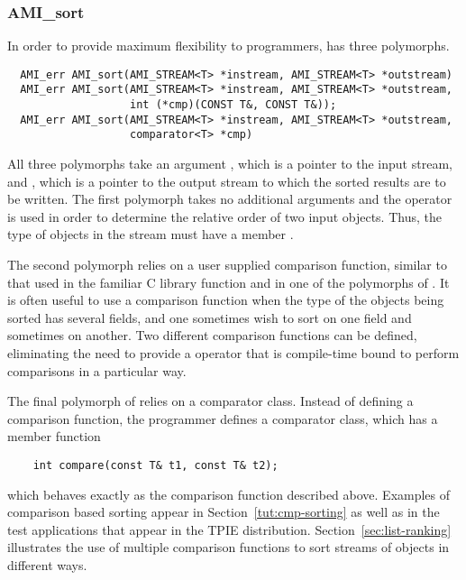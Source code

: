 \subsubsection{AMI\_sort}

In order to provide maximum flexibility to programmers, 
has three polymorphs.
\begin{verbatim}
  AMI_err AMI_sort(AMI_STREAM<T> *instream, AMI_STREAM<T> *outstream)
  AMI_err AMI_sort(AMI_STREAM<T> *instream, AMI_STREAM<T> *outstream,
                   int (*cmp)(CONST T&, CONST T&));
  AMI_err AMI_sort(AMI_STREAM<T> *instream, AMI_STREAM<T> *outstream,
                   comparator<T> *cmp)
\end{verbatim}

All three polymorphs take an argument , which is a pointer
to the input stream, and , which is a pointer to the output
stream to which the sorted results are to be written. The first polymorph
takes no additional arguments and the \myverb{<} operator is used in order to
determine the relative order of two input objects. Thus, the type 
of objects in the stream must have a member .

The second polymorph relies on a user supplied comparison function, similar
to that used in the familiar C library function  and in one
of the polymorphs of . It is often useful to use a
comparison function when the type of the objects being sorted has several
fields, and one sometimes wish to sort on one field and sometimes on
another.  Two different comparison functions can be defined, eliminating
the need to provide a \myverb{<} operator that is compile-time bound to
perform comparisons in a particular way.

The final polymorph of  relies on a comparator
class.
Instead of defining a comparison function, the programmer defines a
comparator class, which has a member function
\begin{verbatim}
    int compare(const T& t1, const T& t2);
\end{verbatim}
which behaves exactly as the comparison function described above.
Examples of comparison based sorting appear in
Section~\ref{tut:cmp-sorting} as well as in the test applications that
appear in the TPIE distribution.  Section~\ref{sec:list-ranking}
illustrates the use of multiple comparison functions to sort streams of
objects in different ways.

